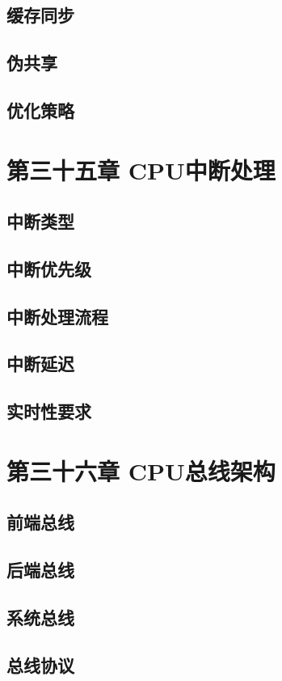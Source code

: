 \documentclass[12pt,UTF8]{ctexbook}
\begin{document}
\section{缓存同步}
\section{伪共享}
\section{优化策略}

\chapter{第三十五章 CPU中断处理}

\section{中断类型}
\section{中断优先级}
\section{中断处理流程}
\section{中断延迟}
\section{实时性要求}

\chapter{第三十六章 CPU总线架构}

\section{前端总线}
\section{后端总线}
\section{系统总线}
\section{总线协议}
\end{document}

